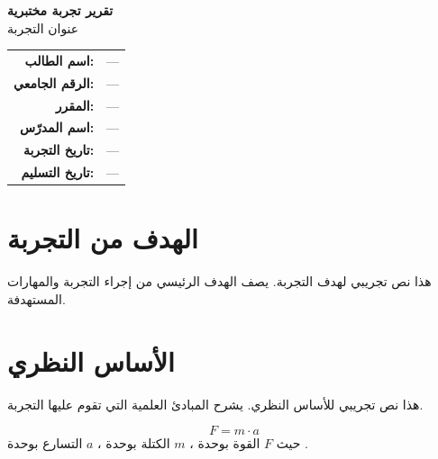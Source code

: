 \documentclass[11pt,a4paper]{article}
\begin{document}
\begin{center}
{\LARGE\bfseries تقرير تجربة مختبرية}\\[1em]
{\Large عنوان التجربة}\\[1.5em]

\begin{tabular}{rl}
\textbf{اسم الطالب:} & --- \\
\textbf{الرقم الجامعي:} & --- \\
\textbf{المقرر:} & --- \\
\textbf{اسم المدرّس:} & --- \\
\textbf{تاريخ التجربة:} & --- \\
\textbf{تاريخ التسليم:} & --- \\
\end{tabular}
\end{center}

\vspace{1.5em}

\section{الهدف من التجربة}
\label{sec:objective}

هذا نص تجريبي لهدف التجربة. يصف الهدف الرئيسي من إجراء التجربة والمهارات المستهدفة.

\section{الأساس النظري}
\label{sec:theory}

هذا نص تجريبي للأساس النظري. يشرح المبادئ العلمية التي تقوم عليها التجربة.

\begin{equation}
\label{eq:main}
F = m \cdot a
\end{equation}
حيث $F$ القوة بوحدة ، $m$ الكتلة بوحدة ، $a$ التسارع بوحدة .

\end{document}
